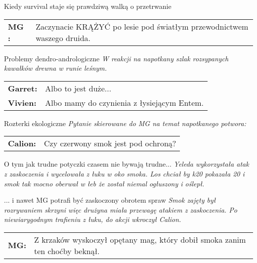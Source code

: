 \documentclass[10pt,twoside,twocolumn]{book}
\begin{document}
\begin{rpg-quotebox}{Kiedy survival staje się prawdziwą walką o przetrwanie}
   \begin{tabularx}{\columnwidth}{lX}
      \textbf{MG :} & Zaczynacie KRĄŻYĆ po lesie pod światłym przewodnictwem waszego druida.\\
   \end{tabularx}
\end{rpg-quotebox}



\begin{rpg-quotebox}{Problemy dendro-andrologiczne}
   \textit{W reakcji na napotkany szlak rozsypanych kawałków drewna w runie leśnym.}\\

   \begin{tabularx}{\columnwidth}{lX}
      \textbf{Garret:} & Albo to jest duże...\\
      \textbf{Vivien:} & Albo mamy do czynienia z łysiejącym Entem.\\
   \end{tabularx}
\end{rpg-quotebox}


\begin{rpg-quotebox}{Rozterki ekologiczne}
   \textit{Pytanie skierowane do MG na temat napotkanego potwora:}

   \begin{tabularx}{\columnwidth}{lX}
      \textbf{Calion:} & Czy czerwony smok jest pod ochroną? \\
   \end{tabularx}
\end{rpg-quotebox}


\begin{rpg-quotebox}{O tym jak trudne potyczki czasem nie bywają trudne...}
   \textit{Yeleda wykorzystała atak z zaskoczenia i wycelowała z łuku w oko smoka. Los chciał by k20 pokazała 20 i smok tak mocno oberwał w łeb że został niemal ogłuszony i oślepł.}
\end{rpg-quotebox}


\begin{rpg-quotebox}{... i nawet MG potrafi być zaskoczony obrotem spraw}
   \textit{Smok zajęty był rozrywaniem skrzyni więc drużyna miała przewagę atakiem z zaskoczenia. Po niewiarygodnym trafieniu z łuku, do akcji wkroczył Calion.}\\

   \begin{tabularx}{\columnwidth}{lX}
      \textbf{MG:} & Z krzaków wyskoczył opętany mag, który dobił smoka zanim ten choćby beknął.\\
   \end{tabularx}
\end{rpg-quotebox}
\end{document}
